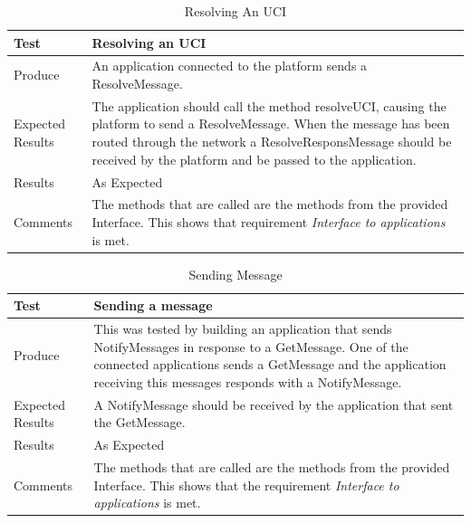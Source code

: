 \begin{table}[!h]
    \begin{tabular}{ | l | p{12cm} |}
    \hline
    Test 	 				& 		 Resolving an UCI\\ \hline
	Produce  				& 		 An application connected to the platform sends a ResolveMessage.\\ \hline
	Expected Results  		& 		 The application should call the method resolveUCI, causing the platform to send a ResolveMessage. When the message has been routed through the network a ResolveResponsMessage should be received by the platform and be passed to the application. \\ \hline
	Results 				& 		 As Expected\\ \hline
	Comments				& 		 The methods that are called are the methods from the provided Interface. This shows that requirement \emph{Interface to applications} is met.\\ \hline
    \end{tabular}
    \caption{Resolving An UCI}
\end{table}

\begin{table}[!h]
    \begin{tabular}{ | l | p{12cm} |}
    \hline
    Test 	 				& 		 Sending a message\\ \hline
	Produce  				& 		 This was tested by building an application that sends NotifyMessages in response to a GetMessage. One of the connected applications sends a GetMessage and the application receiving this messages responds with a NotifyMessage.\\ \hline
	Expected Results  		& 		 A NotifyMessage should be received by the application that sent the GetMessage.\\ \hline
	Results 				& 		 As Expected\\ \hline
	Comments				& 		 The methods that are called are the methods from the provided Interface. This shows that the requirement \emph{Interface to applications} is met. \\ \hline
    \end{tabular}
    \caption{Sending Message}
\end{table}

